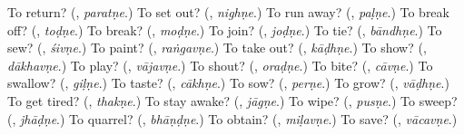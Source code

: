 \begin{tcolorbox}[breakable,colback=teal!4,colframe=teal!35!black,title={Before you move on}]
To return? (\textbf{}, \emph{paratṇe}.) To set out? (\textbf{}, \emph{nighṇe}.) To run away? (\textbf{}, \emph{paḷṇe}.) To break off? (\textbf{}, \emph{toḍṇe}.) To break? (\textbf{}, \emph{moḍṇe}.) To join? (\textbf{}, \emph{joḍṇe}.) To tie? (\textbf{}, \emph{bāndhṇe}.) To sew? (\textbf{}, \emph{śivṇe}.) To paint? (\textbf{}, \emph{raṅgavṇe}.) To take out? (\textbf{}, \emph{kāḍhṇe}.) To show? (\textbf{}, \emph{dākhavṇe}.) To play? (\textbf{}, \emph{vājavṇe}.) To shout? (\textbf{}, \emph{oraḍṇe}.) To bite? (\textbf{}, \emph{cāvṇe}.) To swallow? (\textbf{}, \emph{giḷṇe}.) To taste? (\textbf{}, \emph{cākhṇe}.) To sow? (\textbf{}, \emph{perṇe}.) To grow? (\textbf{}, \emph{vāḍhṇe}.) To get tired? (\textbf{}, \emph{thakṇe}.) To stay awake? (\textbf{}, \emph{jāgṇe}.) To wipe? (\textbf{}, \emph{pusṇe}.) To sweep? (\textbf{}, \emph{jhāḍṇe}.) To quarrel? (\textbf{}, \emph{bhāṇḍṇe}.) To obtain? (\textbf{}, \emph{miḷavṇe}.) To save? (\textbf{}, \emph{vācavṇe}.)
\end{tcolorbox}
